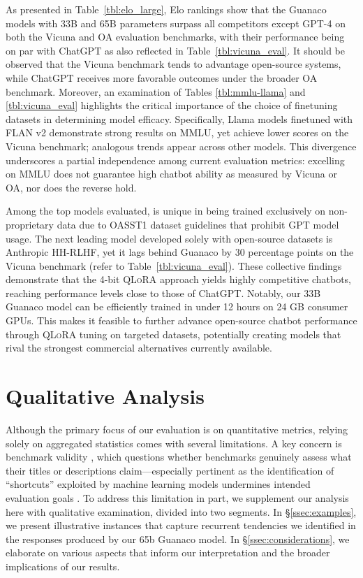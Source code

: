 As presented in Table~\ref{tbl:elo_large}, Elo rankings show that the {Guanaco} models with 33B and 65B parameters surpass all competitors except GPT-4 on both the Vicuna and OA evaluation benchmarks, with their performance being on par with ChatGPT as also reflected in Table~\ref{tbl:vicuna_eval}. It should be observed that the Vicuna benchmark tends to advantage open-source systems, while ChatGPT receives more favorable outcomes under the broader OA benchmark. Moreover, an examination of Tables \ref{tbl:mmlu-llama} and \ref{tbl:vicuna_eval} highlights the critical importance of the choice of finetuning datasets in determining model efficacy. Specifically, Llama models finetuned with FLAN v2 demonstrate strong results on MMLU, yet achieve lower scores on the Vicuna benchmark; analogous trends appear across other models. This divergence underscores a partial independence among current evaluation metrics: excelling on MMLU does not guarantee high chatbot ability as measured by Vicuna or OA, nor does the reverse hold.

Among the top models evaluated,  is unique in being trained exclusively on non-proprietary data due to OASST1 dataset guidelines that prohibit GPT model usage. The next leading model developed solely with open-source datasets is Anthropic HH-RLHF, yet it lags behind {Guanaco} by 30 percentage points on the Vicuna benchmark (refer to Table~\ref{tbl:vicuna_eval}). These collective findings demonstrate that the 4-bit \textsc{QLoRA} approach yields highly competitive chatbots, reaching performance levels close to those of ChatGPT. Notably, our 33B {Guanaco} model can be efficiently trained in under 12 hours on 24 GB consumer GPUs. This makes it feasible to further advance open-source chatbot performance through \textsc{QLoRA} tuning on targeted datasets, potentially creating models that rival the strongest commercial alternatives currently available.

\section{Qualitative Analysis}

Although the primary focus of our evaluation is on quantitative metrics, relying solely on aggregated statistics comes with several limitations. A key concern is benchmark validity \citep{liao2021we}, which questions whether benchmarks genuinely assess what their titles or descriptions claim—especially pertinent as the identification of ``shortcuts'' exploited by machine learning models undermines intended evaluation goals \citep{gururangan2018annotation, poliak2018hypothesis}. To address this limitation in part, we supplement our analysis here with qualitative examination, divided into two segments. In \S\ref{ssec:examples}, we present illustrative instances that capture recurrent tendencies we identified in the responses produced by our 65b {Guanaco} model. In \S\ref{ssec:considerations}, we elaborate on various aspects that inform our interpretation and the broader implications of our results.

